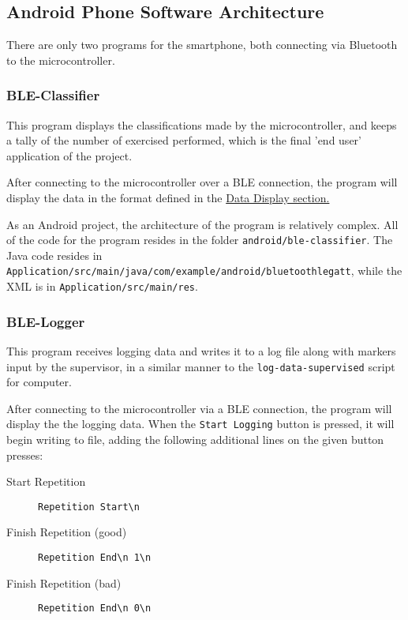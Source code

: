 \documentclass[a4paper]{article}
\begin{document}
\subsection{Android Phone Software Architecture}%
\label{subsec:dc_asa}

There are only two programs for the smartphone, both connecting via Bluetooth to the microcontroller.

\subsubsection{BLE-Classifier}
\label{subsubsec:dc_asa_classifier}

This program displays the classifications made by the microcontroller, and keeps a tally of the number of exercised performed, which is the final 'end user' application of the project.

After connecting to the microcontroller over a BLE connection, the program will display the data in the format defined in the \hyperref[subsec:dc_datadisplay]{Data Display section.}

As an Android project, the architecture of the program is relatively complex. All of the code for the program resides in the folder \lstinline{android/ble-classifier}. The Java code resides in \lstinline{Application/src/main/java/com/example/android/bluetoothlegatt}, while the XML is in \lstinline{Application/src/main/res}.

\subsubsection{BLE-Logger}
\label{subsubsec:dc_asa_logger}

This program receives logging data and writes it to a log file along with markers input by the supervisor, in a similar manner to the \lstinline{log-data-supervised} script for computer.

After connecting to the microcontroller via a BLE connection, the program will display the the logging data. When the \lstinline{Start Logging} button is pressed, it will begin writing to file, adding the following additional lines on the given button presses:

\begin{description}
\item[Start Repetition] \lstinline|Repetition Start\n|
\item[Finish Repetition (good)] \lstinline|Repetition End\n 1\n|
\item[Finish Repetition (bad)] \lstinline|Repetition End\n 0\n|
\end{description}
\end{document}
